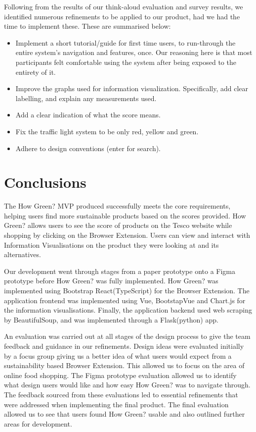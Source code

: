 \documentclass[a4,10pt,twocolumn]{article}
\begin{document}
Following from the results of our think-aloud evaluation and survey results, we identified numerous refinements to be applied to our product, had we had the time to implement these. These are summarised below:

\begin{itemize}
    \item Implement a short tutorial/guide for first time users, to run-through the entire system's navigation and features, once. Our reasoning here is that most participants felt comfortable using the system after being exposed to the entirety of it. 
    \item Improve the graphs used for information visualization. Specifically, add clear labelling, and explain any measurements used. 
    \item Add a clear indication of what the score means. \item Fix the traffic light system to be only red, yellow and green.
    \item Adhere to design conventions (enter for search).
\end{itemize}


\section*{Conclusions}
The How Green? MVP produced successfully meets the core requirements, helping users find more sustainable products based on the scores provided. How Green? allows users to see the score of products on the Tesco website while shopping by clicking on the Browser Extension. Users can view and interact with Information Visualisations on the product they were looking at and its alternatives.

Our development went through stages from a paper prototype onto a Figma prototype before How Green? was fully implemented. How Green? was implemented using Bootstrap React(TypeScript) for the Browser Extension. The application frontend was implemented using Vue, BootstapVue and Chart.js for the information visualisations. Finally, the application backend used web scraping by BeautifulSoup, and was implemented through a Flask(python) app.

An evaluation was carried out at all stages of the design process to give the team feedback and guidance in our refinements. Design ideas were evaluated initially by a focus group giving us a better idea of what users would expect from a sustainability based Browser Extension. This allowed us to focus on the area of online food shopping. The Figma prototype evaluation allowed us to identify what design users would like and how easy How Green? was to navigate through. The feedback sourced from these evaluations led to essential refinements that were addressed when implementing the final product. The final evaluation allowed us to see that users found How Green? usable and also outlined further areas for development.
\end{document}
